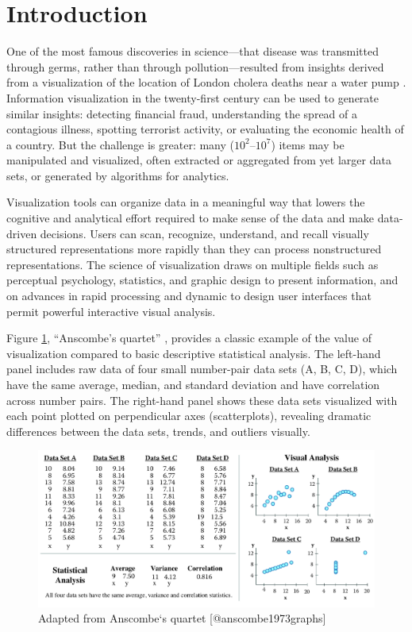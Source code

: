 \documentclass[]{krantz}
\begin{document}
\section{Introduction}\label{sec:viz-1}

One of the most famous discoveries in science---that disease was
transmitted through germs, rather than through pollution---resulted from
insights derived from a visualization of the location of London cholera
deaths near a water pump \citep{snow1855mode}. Information visualization
in the twenty-first century can be used to generate similar insights:
detecting financial fraud, understanding the spread of a contagious
illness, spotting terrorist activity, or evaluating the economic health
of a country. But the challenge is greater: many
(\(10^{2}\)--\(10^{7}\)) items may be manipulated and visualized, often
extracted or aggregated from yet larger data sets, or generated by
algorithms for analytics.

Visualization tools can organize data in a meaningful way that lowers
the cognitive and analytical effort required to make sense of the data
and make data-driven decisions. Users can scan, recognize, understand,
and recall visually structured representations more rapidly than they
can process nonstructured representations. The science of visualization
draws on multiple fields such as perceptual psychology, statistics, and
graphic design to present information, and on advances in rapid
processing and dynamic to design user interfaces that permit powerful
interactive visual analysis.

Figure \ref{fig:fig9-1}, ``Anscombe's quartet''
\citep{anscombe1973graphs}, provides a classic example of the value of
visualization compared to basic descriptive statistical analysis. The
left-hand panel includes raw data of four small number-pair data sets
(A, B, C, D), which have the same average, median, and standard
deviation and have correlation across number pairs. The right-hand panel
shows these data sets visualized with each point plotted on
perpendicular axes (scatterplots), revealing dramatic differences
between the data sets, trends, and outliers visually.

\begin{figure}

{\centering \includegraphics[width=0.9\linewidth]{ChapterViz/figures/fig9-1-new} 

}

\caption{Adapted from Anscombe`s quartet [@anscombe1973graphs]}\label{fig:fig9-1}
\end{figure}
\end{document}
